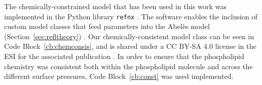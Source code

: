 The chemically-constrained model that has been used in this work was implemented in the Python library \texttt{refnx} \cite{nelson_refnx_2019,nelson_refnx_2019-1}.
The software enables the inclusion of custom model classes that feed parameters into the Abel\`{e}s model (Section~\ref{sec:refltheory}) \cite{abeles_sur_1948,parratt_surface_1954}.
Our chemically-consistent model class can be seen in Code Block~\ref{cb:chemconsis}, and is shared under a CC BY-SA 4.0 license in the ESI for the associated publication \cite{mccluskey_arm61/lipids_at_airdes_2019}.
In order to ensure that the phospholipid chemistry was consistent both within the phospholipid molecule and across the different surface pressures, Code Block~\ref{cb:const} was used implemented.
%
\begin{figure}
    \centering
        
\end{figure}
%
\begin{figure}
    \centering
        
\end{figure}
%


